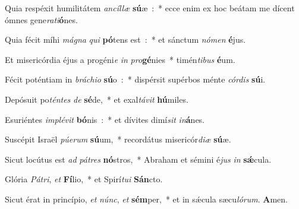 ﻿\item Quia respéxit humilitátem \emph{an}\-\emph{cíl}\-\emph{læ} \textbf{sú}\-æ~:~* ecce enim ex hoc beátam me dícent ómnes gene\emph{ra}\emph{ti}\textbf{ó}nes.
\item Quia fécit míhi \emph{má}\-\emph{gna} \emph{qui} \textbf{pó}\-tens est~:~* et sánctum \emph{nó}\-\emph{men} \textbf{é}jus.
\item Et misericórdia éjus a progéni\emph{e} \emph{in} \emph{pro}\-\textbf{gé}\-nies~* timén\emph{ti}\-\emph{bus} \textbf{é}um.
\item Fécit poténtiam in \emph{brá}\-\emph{chi}\-\emph{o} \textbf{sú}\-o~:~* dispérsit supérbos ménte \emph{cór}\-\emph{dis} \textbf{sú}i.
\item Depósuit po\emph{tén}\-\emph{tes} \emph{de} \textbf{sé}\-de,~* et exal\emph{tá}\-\emph{vit} \textbf{hú}miles.
\item Esuriéntes \emph{im}\-\emph{plé}\-\emph{vit} \textbf{bó}\-nis~:~* et dívites dimí\emph{sit} \emph{in}\textbf{á}nes.
\item Suscépit Israël \emph{pú}\-\emph{e}\-\emph{rum} \textbf{sú}\-um,~* recordátus misericór\emph{di}\-\emph{æ} \textbf{sú}æ.
\item Sicut locútus est \emph{ad} \emph{pá}\-\emph{tres} \textbf{nó}\-stros,~* Abraham et sémini é\emph{jus} \emph{in} \textbf{sǽ}cula.
\item Glória \emph{Pá}\-\emph{tri}, \emph{et} \textbf{Fí}\-lio,~* et Spirí\emph{tu}\-\emph{i} \textbf{Sán}cto.
\item Sicut érat in princípio, \emph{et} \emph{núnc}, \emph{et} \textbf{sém}\-per,~* et in sǽcula sæcu\emph{ló}\-\emph{rum}. \textbf{A}men.
